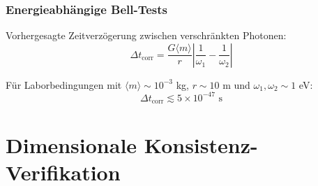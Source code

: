 	\subsubsection{Energieabhängige Bell-Tests}
	
	Vorhergesagte Zeitverzögerung zwischen verschränkten Photonen:
	\begin{equation}
		\Delta t_{\text{corr}} = \frac{G\langle m \rangle}{r} \left|\frac{1}{\omega_1} - \frac{1}{\omega_2}\right|
		\label{eq:correlation_time_delay}
	\end{equation}
	
	Für Laborbedingungen mit $\langle m \rangle \sim 10^{-3}$ kg, $r \sim 10$ m und $\omega_1,\omega_2 \sim 1$ eV:
	\begin{equation}
		\Delta t_{\text{corr}} \lesssim 5\times10^{-47} \text{ s}
		\label{eq:laboratory_delay}
	\end{equation}

	\section{Dimensionale Konsistenz-Verifikation}
	
	\begin{table}[htbp]
		\centering
		\caption{Dimensionale Konsistenz-Verifikation für Photonendynamik im T0-Modell}
	\end{table}
	

	